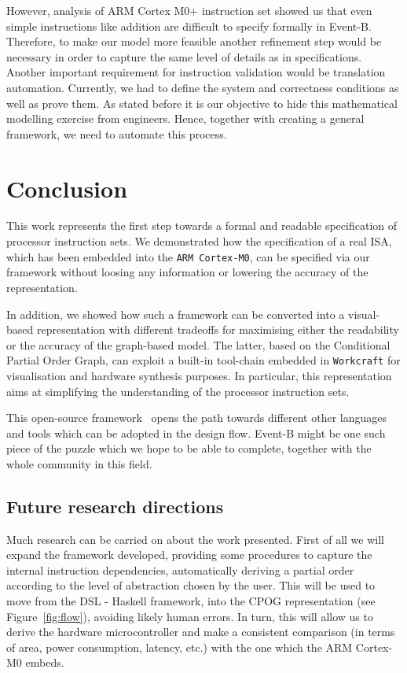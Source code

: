 \documentclass[conference]{IEEEtran}
\begin{document}
However, analysis of ARM Cortex M0+ instruction set showed us that even simple instructions like addition
are difficult to specify formally in Event-B. Therefore, to make our model more feasible another refinement step would be
necessary in order to capture the same level of details as in specifications. Another important requirement
for instruction validation would be translation automation. Currently, we had to define the system and
correctness conditions as well as prove them. As stated before it is our objective to hide this mathematical
modelling exercise from engineers. Hence, together with creating a general framework, we need to automate
this process.


\section{Conclusion}
\label{sec:conclusion}
This work represents the first step towards a formal and readable specification of
processor instruction sets. We demonstrated how the specification of a real ISA, which has
been embedded into the \verb|ARM Cortex-M0|, can be specified via our framework without
loosing any information or lowering the accuracy of the representation.

In addition, we showed how such a framework can be converted into a visual-based
representation with different tradeoffs for maximising either the readability or the accuracy
of the graph-based model. The latter, based on the Conditional Partial Order Graph, can
exploit a built-in tool-chain embedded in \verb|Workcraft| for visualisation and hardware
synthesis purposes. In particular, this representation aims at simplifying the understanding of
the processor instruction sets.

This open-source framework~\cite{repo} opens the path towards different other languages and tools which
can be adopted in the design flow. Event-B might be one such piece of the puzzle which we
hope to be able to complete, together with the whole community in this field.

\subsection{Future research directions}
\label{sec:frd}
Much research can be carried on about the work presented. First of all we will expand the
framework developed, providing some procedures to capture the internal instruction
dependencies, automatically deriving a partial order according to the level of abstraction
chosen by the user. This will be used to move from the DSL - Haskell framework, into the CPOG
representation (see Figure~\ref{fig:flow}), avoiding likely human errors. In turn, this will
allow us to derive the hardware microcontroller and make a consistent comparison (in terms of
area, power consumption, latency, etc.) with the one which the ARM Cortex-M0 embeds.
\end{document}
